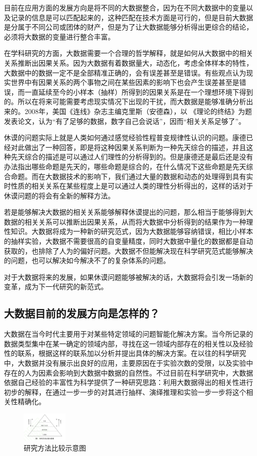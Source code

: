 \documentclass{ctexart}
\begin{document}
目前在应用方面的发展方向是将不同的大数据整合，因为在不同大数据中的变量以及记录的信息是可以匹配起来的，这种匹配在技术方面是可行的，但是目前大数据是分属于不同公司或团体的财产，但是为了让大数据能够分析得出更综合的结论，必须将大数据的变量进行整合丰富。

在学科研究的方面，大数据需要一个合理的哲学解释，就是如何从大数据中的相关关系推断出因果关系。因为大数据有着数据量大，动态化，考虑全体样本的特性，大数据中的数据一定不是全部精准正确的，会有误差甚至是错误。有些观点认为现实世界中有因果关系的两个事物之间在某些因素的影响下也会产生误差甚至是错误，而一直延续至今的小样本（抽样）所得到的因果关系是在一个理想环境下得到的。所以在将来可能需要考虑现实情况下出现的干扰，而大数据是能够准确分析出来的。2008年，美国《连线》杂志主编克里斯（安德森），以 《理论的终结》为题发表论文，认为“有了足够的数据，数字自己会说话”，因而“相关关系足够了”。

休谟的问题实际上就是人类如何通过感觉经验性程普变规律性认识的问题。康德已经对此做出了一种回答，即是将这种因果关系判断为一种先天综合的描述，并且这种先天综合的描述是可以通过人们理性的分析得到的。但是康德还是最后还是没有办法指出哪些命题是先天的，哪些命题是综合的，在什么情况下这些命题是先天综合命题。而在大数据技术的影响下，我们通过大量的数据和动态的处理得到具有实时性质的相关关系在某些程度上是可以通过人类的理性分析得出的，这样的话对于休谟问题的将会有全新的解释方法。

若是能够解决大数据的相关关系能够解释休谟提出的问题，那么相当于能够得到大数据的相关关系可以推断出因果关系，从而将大数据中分析得到的结果作为一种理性知识。大数据将成为一种新的研究范式，因为大数据能够容纳错误，相比小样本的抽样实验，大数据不需要很高的自变量精度，同时大数据中量化的数据都是自动获取的，也排除了人为的偏好问题。大数据不但能解决现在科学研究范式能够解决的问题，也可以解决如今解决不了的复杂体系的问题。

对于大数据将来的发展，如果休谟问题能够被解决的话，大数据将会引发一场新的变革，成为下一代研究的新范式。

\subsection{大数据目前的发展方向是怎样的？}

大数据在当今时代主要用于对某些特定领域的问题智能化解决方案。当今所记录的数据类型集中在某一确定的领域内部，寻找在这一领域内部存在的相关性以及经验性的联系，根据这样的联系加以分析并提出具体的解决方案。在以往的科学研究中，大数据并没有展示出良好的应用，主要原因在于实验次数的受限，以及实验中存在的人为因素会影响到大数据中数据的自然性。不过目前在科学研究中，大数据依据自己经验的丰富性为科学提供了一种研究思路：利用大数据得出的相关性进行初步的解释，在通过一步一步的对其进行抽样、演绎推理和实验一步一步将这个相关性精确化。
\begin{figure}[htbp] 		
		\centering
		\includegraphics[scale=2,width=0.2\textwidth]{first.jpg}
		\caption{研究方法比较示意图}
		\label{first}		
\end{figure}
\end{document}
